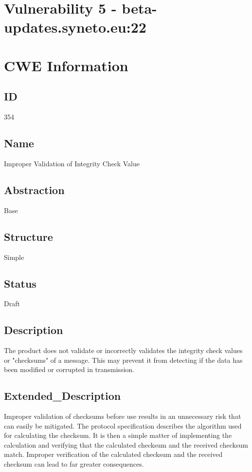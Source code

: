 \section*{Vulnerability 5 - beta-updates.syneto.eu:22}

\section*{CWE Information}
\subsection*{ID}
354

\subsection*{Name}
Improper Validation of Integrity Check Value

\subsection*{Abstraction}
Base

\subsection*{Structure}
Simple

\subsection*{Status}
Draft

\subsection*{Description}
The product does not validate or incorrectly validates the integrity check values or "checksums" of a message. This may prevent it from detecting if the data has been modified or corrupted in transmission.

\subsection*{Extended\_Description}
Improper validation of checksums before use results in an unnecessary risk that can easily be mitigated. The protocol specification describes the algorithm used for calculating the checksum. It is then a simple matter of implementing the calculation and verifying that the calculated checksum and the received checksum match. Improper verification of the calculated checksum and the received checksum can lead to far greater consequences.

